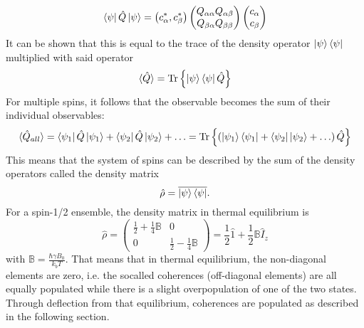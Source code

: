     \begin{equation}
    \bra\psi\hat Q\ket\psi = \left( c_\alpha^*, c_\beta^*\right)
    \begin{pmatrix}
        Q_{\alpha\alpha} Q_{\alpha\beta}\\
        Q_{\beta\alpha} Q_{\beta\beta}
    \end{pmatrix}
    \begin{pmatrix}
        c_\alpha\\
        c_\beta
    \end{pmatrix}
    \end{equation}
    It can be shown that this is equal to the trace of the density operator
    $\ket\psi\bra\psi$multiplied with said operator
    \begin{equation}
        \braket{\hat Q} = \operatorname{Tr} \left\{\ket\psi\bra\psi\hat Q\right\}
    \end{equation}
    For multiple spins, it follows that the observable becomes the sum of their individual
    observables:
    \begin{equation}
        \braket{\hat Q_{all}}= \bra{\psi_1}\hat Q\ket{\psi_1} + \bra{\psi_2}\hat Q\ket{\psi_2} + \hdots =
        \operatorname{Tr}{\left\{\left(\ket{\psi_1}\bra{\psi_1} + \bra{\psi_2}\ket{\psi_2}+ \hdots \right) \hat Q\right\}}
    \end{equation}
    This means that the system of spins can be described by the sum of the density operators called
    the density matrix
    \begin{equation}
        \hat\rho = \overline{\ket\psi\bra\psi}.
    \end{equation}
    For a spin-1/2 ensemble, the density matrix in thermal equilibrium is
    \begin{equation}
        \hat \rho = \begin{pmatrix} \frac{1}{2}+\frac{1}{4}\mathbb{B}& 0\\ 0&
        \frac{1}{2}-\frac{1}{4}\mathbb{B}\end{pmatrix} = \frac {1}{2} \hat1 + \frac{1}{2} \mathbb{B}
        \hat I_z
    \end{equation}
    with $\mathbb{B} = \frac{\hbar\gamma B_0}{k_b T}$. That means that in thermal equilibrium, the
    non-diagonal elements are zero, i.e. the socalled coherences (off-diagonal elements) are all
    equally populated while there is a slight overpopulation of one of the two states. Through deflection from that
    equilibrium, coherences are populated as described in the following section.
